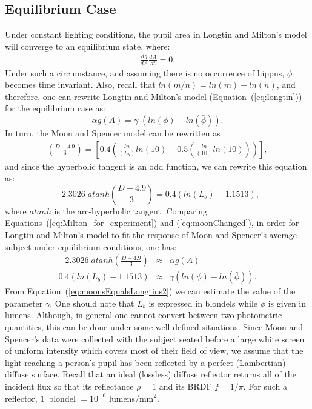 \documentclass{acmtog}
\begin{document}
\subsection{Equilibrium Case}
\label{subsec:EquilibriumCase}
Under constant lighting conditions, the pupil area in  Longtin and Milton's model will converge to an equilibrium state,
where:
\begin{eqnarray*}
  \frac{dg}{dA}\frac{dA}{dt} = 0. 
  \label{eq:longtinArea}
\end{eqnarray*} 
%
Under such a circumstance, and assuming there is no occurrence of hippus, $\phi$ becomes time invariant. Also, recall that
${{ln}}(m/n)={{ln}}(m) - ln(n)$, and therefore, one can rewrite  Longtin and Milton's model
(Equation~(\ref{eq:longtin})) for the equilibrium case as:
\begin{equation}
 \alpha g(A) = \gamma \; ({{ln}}(\phi) - {{ln}}(\bar{\phi})). 
 \label{eq:Milton_for_experiment} 
\end{equation}
%
In turn, the Moon and Spencer model can be rewritten as
\begin{eqnarray*}
  \left(\frac{D - 4.9}{3} \right) = \left[0.4 \left( \frac{ln}{(L_{b})}ln(10) - 0.5 \left(\frac{ln}{(10)}ln(10)\right)
\right)\right], 
  \label{eq:moonAndSpencerRewrote}
\end{eqnarray*}
and since the hyperbolic tangent is an odd function, we can rewrite this equation as: 
\begin{equation}
  -2.3026 \; {{atanh}} \left(\frac{D-4.9}{3}\right) = 0.4 ({{ln}}(L_{b}) -1.1513),
\label{eq:moonChanged}
\end{equation} 
where ${{atanh}}$ is the arc-hyperbolic tangent. Comparing Equations~(\ref{eq:Milton_for_experiment}) and
(\ref{eq:moonChanged}), in order for  Longtin and Milton's model to fit the response of Moon and Spencer's average
subject under  equilibrium conditions, one has:
\begin{eqnarray}
\label{eq:moonsEqualsLongtins1}
 -2.3026 \; {{atanh}} \left(\frac{D-4.9}{3}\right) & \approx & \alpha g(A) \\
\label{eq:moonsEqualsLongtins2}
 0.4 ( {{ln}}(L_{b}) -1.1513)  & \approx &  \gamma ({{ln}}(\phi) - {{ln}}(\bar{\phi})).
\end{eqnarray} 
%
From Equation~(\ref{eq:moonsEqualsLongtins2}) we can estimate the value of the parameter $\gamma$. One should note that $L_b$ is expressed in blondels while $\phi$ is given in lumens. 
Although, in general one cannot convert between two photometric quantities, this can be done under some well-defined situations. Since Moon and Spencer's data were collected with the subject seated before a large white screen of uniform intensity which covers most of their field of view, we assume that the light reaching a person's pupil has been reflected by a perfect (Lambertian) diffuse surface.  Recall that an ideal (lossless) diffuse reflector returns all of the incident flux so that its reflectance
$\rho = 1$ and its BRDF $f = 1/\pi$. For such a reflector, $1$~blondel $= 10^{-6}$
lumens/mm$^2$. 
\end{document}
